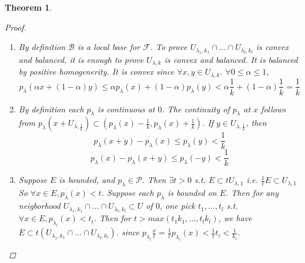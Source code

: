 \documentclass{article}
\newtheorem*{theorem}{Theorem}
\begin{document}
\begin{theorem}
\begin{proof}
\begin{enumerate}
\begin{itemize}
            \end{itemize}
            \item By definition $\mathcal{B}$ is a local base for $\mathcal{F}$.
            To prove $U_{\lambda_1, k_1} \cap ... \cap U_{\lambda_l, k_l}$ is convex and balanced,
            it is enough to prove $U_{\lambda, k}$ is convex and balanced.
            It is balanced by positive homogenerity. It is convex since $\forall x, y \in U_{\lambda, k}$.
            $\forall 0 \le \alpha \le 1$,
            \[
                p_{\lambda}(\alpha x + (1 - \alpha)y) \le \alpha p_{\lambda}(x) + (1-\alpha)p_{\lambda}(y) < \alpha \frac{1}{k} + (1 - \alpha) \frac{1}{k} = \frac{1}{k}
            \]
            \item By definition each $p_{\lambda}$ is continuous at $0$.
            The continuity of $p_{\lambda}$ at $x$ follows from $p_{\lambda}(x + U_{\lambda, \frac{1}{k}}) \subset (p_{\lambda}(x) - \frac{1}{k}, p_{\lambda}(x) + \frac{1}{k})$.
            If $y \in U_{\lambda, \frac{1}{k}}$, then 
            \[p_{\lambda}(x + y) - p_{\lambda}(x) \le p_{\lambda}(y) < \frac{1}{k}\]
            \[p_{\lambda}(x) - p_{\lambda}(x + y) \le p_{\lambda}(-y) < \frac{1}{k}\]
            \item Suppose $E$ is bounded, and $p_{\lambda} \in \mathcal{P}$. Then $\exists t > 0$ s.t. $E \subset tU_{\lambda, 1}$ i.e. $\frac{1}{t}E \subset U_{\lambda, 1}$
            So $\forall x \in E, p_{\lambda}(x) < t$.
            Suppose each $p_{\lambda}$ is bounded on $E$. Then for any neigborhood $U_{\lambda_1, k_1} \cap ... \cap U_{\lambda_l, k_l} \subset U$ of $0$,
            one pick $t_1, ..., t_l$ s.t. $\forall x \in E, p_{\lambda_i}(x) < t_i$. 
            Then for $t > max(t_1 k_1, ..., t_l k_l)$, we have $E \subset t(U_{\lambda_1, k_1} \cap ... \cap U_{\lambda_l, k_l})$.
            since $p_{\lambda_i}\frac{x}{t} = \frac{1}{t} p_{\lambda_i}(x) < \frac{1}{t}t_i < \frac{1}{k_i}$.
        \end{enumerate}
    \end{proof}
\end{theorem}
\end{document}
